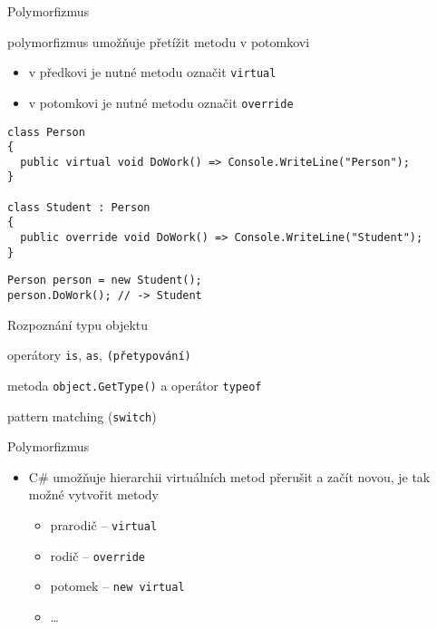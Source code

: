\begin{frame}[fragile]
\begin{bitemize}{Polymorfizmus}
\item polymorfizmus umožňuje přetížit metodu v potomkovi
\begin{itemize}
\item v předkovi je nutné metodu označit \lstinline|virtual|
\item v potomkovi je nutné metodu označit \lstinline|override|
\end{itemize}
\end{bitemize}
\vfill
\begin{yesblock}
\begin{lstlisting}[basicstyle=\small]
class Person
{
  public virtual void DoWork() => Console.WriteLine("Person");
}

class Student : Person
{
  public override void DoWork() => Console.WriteLine("Student");
}
\end{lstlisting}
\end{yesblock}
\vfill
\begin{yesblock}
\begin{lstlisting}[basicstyle=\small]
Person person = new Student();
person.DoWork(); // -> Student
\end{lstlisting}
\end{yesblock}
\end{frame}


\begin{frame}[fragile]
\begin{bitemize}{Rozpoznání typu objektu}
\item operátory \lstinline|is|, \lstinline|as|, \lstinline|(přetypování)|
\item metoda \lstinline|object.GetType()| a operátor \lstinline|typeof|
\item pattern matching (\lstinline|switch|)
\end{bitemize}
\vfill
\begin{bonusblock}{Polymorfizmus}
\begin{itemize}
\item C\# umožňuje hierarchii virtuálních metod přerušit a začít novou, je tak možné vytvořit metody
\begin{itemize}
\item prarodič -- \lstinline|virtual|
\item rodič -- \lstinline|override|
\item potomek -- \lstinline|new virtual|
\item \ldots
\end{itemize}

\end{itemize}
\end{bonusblock}
\end{frame}





